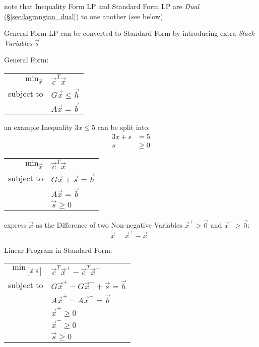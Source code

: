 note that Inequality Form LP and Standard Form LP are \emph{Dual}
(\S\ref{sec:lagrangian_dual}) to one another (see below)

General Form LP can be converted to Standard Form by introducing extra
\emph{Slack Variables} $\vec{s}$

General Form:

\begin{tabular}{r l}
  $\mathrm{min}_{\vec{x}}$ & $\vec{c}^T\vec{x}$     \\
  subject to               & $G\vec{x} \leq \vec{h}$   \\
                           & $A\vec{x} = \vec{b}$ \\
\end{tabular}

an example Inequality $3x \leq 5$ can be split into:
\begin{align*}
  3x + s & = 5 \\
  s      & \geq 0
\end{align*}

\begin{tabular}{r l}
  $\mathrm{min}_{\vec{x}}$ & $\vec{c}^T\vec{x}$     \\
  subject to               & $G\vec{x} + \vec{s} = \vec{h}$   \\
                           & $A\vec{x} = \vec{b}$ \\
                           & $\vec{s} \geq 0$ \\
\end{tabular}

express $\vec{x}$ as the Difference of two Non-negative Variables $\vec{x}^+
\geq \vec{0}$ and $\vec{x}^- \geq \vec{0}$:
\[
  \vec{x} = \vec{x}^+ - \vec{x}^-
\]

Linear Program in Standard Form:

\begin{tabular}{r l}
  $\mathrm{min}_{[\vec{x} \ \vec{s}]}$ &
    $\vec{c}^T\vec{x}^+ - \vec{c}^T\vec{x}^-$     \\
  subject to               & $G\vec{x}^+ - G\vec{x}^- + \vec{s} = \vec{h}$   \\
                           & $A\vec{x}^+ - A\vec{x}^- = \vec{b}$ \\
                           & $\vec{x}^+ \geq 0$ \\
                           & $\vec{x}^- \geq 0$ \\
                           & $\vec{s}   \geq 0$ \\
\end{tabular}

